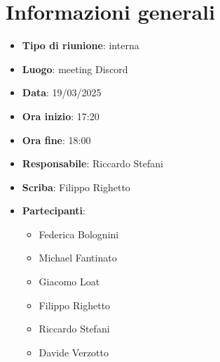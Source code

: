


\section{Informazioni generali}

\begin{itemize}
    \item \textbf{Tipo di riunione}: interna
    \item \textbf{Luogo}: meeting Discord
    \item \textbf{Data}: 19/03/2025
    \item \textbf{Ora inizio}: 17:20
    \item \textbf{Ora fine}: 18:00
    \item \textbf{Responsabile}: Riccardo Stefani
    \item \textbf{Scriba}: Filippo Righetto
    \item \textbf{Partecipanti}:
    \begin{itemize}
        \item Federica Bolognini
        \item Michael Fantinato
        \item Giacomo Loat
        \item Filippo Righetto
        \item Riccardo Stefani
        \item Davide Verzotto
    \end{itemize}
\end{itemize}
